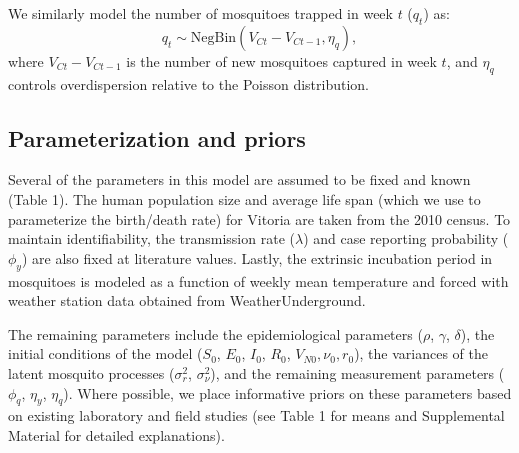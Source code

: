 \documentclass[10pt,letterpaper]{article}
\begin{document}
We similarly model the number of mosquitoes trapped in week $t$ ($q_t$) as:
\begin{equation}
q_t \sim \text{NegBin}(V_{Ct} - V_{Ct-1}, \eta_q),
\end{equation}
where $V_{Ct} - V_{Ct-1}$ is the number of new mosquitoes captured in week $t$, and $\eta_q$ controls overdispersion relative to the Poisson distribution.

\subsection*{Parameterization and priors}

Several of the parameters in this model are assumed to be fixed and known (Table 1).
The human population size and average life span (which we use to parameterize the birth/death rate) for Vitoria are taken from the 2010 census.
To maintain identifiability, the transmission rate ($\lambda$) and case reporting probability ($\phi_y$) are also fixed at literature values.
Lastly, the extrinsic incubation period in mosquitoes is modeled as a function of weekly mean temperature and forced with weather station data obtained from WeatherUnderground.

The remaining parameters include the epidemiological parameters ($\rho$, $\gamma$, $\delta$), the initial conditions of the model ($S_0$, $E_0$, $I_0$, $R_0$, $V_{N0}, \nu_0, r_0$), the variances of the latent mosquito processes ($\sigma^2_r$, $\sigma^2_{\nu}$), and the remaining measurement parameters ($\phi_q$, $\eta_y$, $\eta_q$).  
Where possible, we place informative priors on these parameters based on existing laboratory and field studies (see Table 1 for means and Supplemental Material for detailed explanations).
\end{document}
